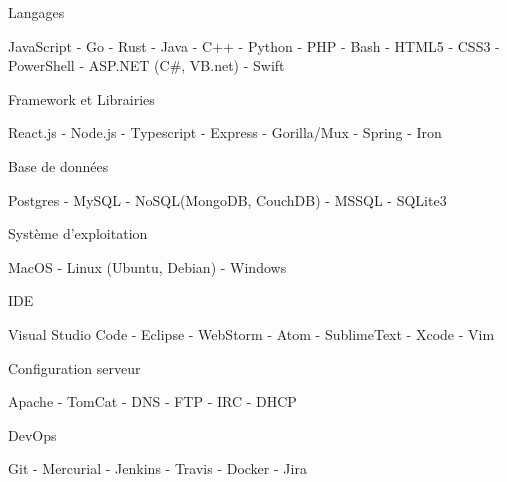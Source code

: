 \begin{cventries}
   \cventry
    {Langages}
    {}
    {}
    {}
    {
      \begin{cvitems}
        \item {JavaScript - Go - Rust - Java - C++ - Python - PHP - Bash - HTML5 - CSS3 - PowerShell - ASP.NET (C\#, VB.net) - Swift }
      \end{cvitems}
    }
    
    \cventry
    {Framework et Librairies}
    {}
    {}
    {}
    {
      \begin{cvitems}
        \item {React.js - Node.js - Typescript - Express - Gorilla/Mux - Spring - Iron}
      \end{cvitems}
    }
    
    \cventry
    {Base de données}
    {}
    {}
    {}
    {
      \begin{cvitems}
        \item {Postgres - MySQL - NoSQL(MongoDB, CouchDB) -  MSSQL - SQLite3}
      \end{cvitems}
    }
    
    \cventry
    {Système d'exploitation}
    {}
    {}
    {}
    {
      \begin{cvitems}
        \item {MacOS - Linux (Ubuntu, Debian) - Windows}
      \end{cvitems}
    }
    
    \cventry
    {IDE}
    {}
    {}
    {}
    {
      \begin{cvitems}
        \item {Visual Studio Code - Eclipse - WebStorm - Atom - SublimeText - Xcode - Vim}
      \end{cvitems}
    }
    
    \cventry
    {Configuration serveur}
    {}
    {}
    {}
    {
      \begin{cvitems}
        \item {Apache - TomCat - DNS - FTP - IRC - DHCP}
      \end{cvitems}
    }
    
    \cventry
    {DevOps}
    {}
    {}
    {}
    {
      \begin{cvitems}
        \item {Git - Mercurial - Jenkins - Travis - Docker - Jira}
      \end{cvitems}
    }
\end{cventries}
